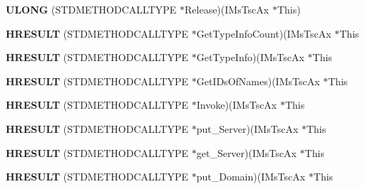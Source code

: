 \begin{DoxyCompactItemize}
\item 
\mbox{\label{struct_i_ms_tsc_ax_vtbl_a4a95618482c2a91fa01823290c9b4581}} 
{\bfseries U\+L\+O\+NG} (S\+T\+D\+M\+E\+T\+H\+O\+D\+C\+A\+L\+L\+T\+Y\+PE $\ast$Release)(I\+Ms\+Tsc\+Ax $\ast$This)
\item 
\mbox{\label{struct_i_ms_tsc_ax_vtbl_a1417abc3fd2b2ca2965a8dc2d57def0f}} 
{\bfseries H\+R\+E\+S\+U\+LT} (S\+T\+D\+M\+E\+T\+H\+O\+D\+C\+A\+L\+L\+T\+Y\+PE $\ast$Get\+Type\+Info\+Count)(I\+Ms\+Tsc\+Ax $\ast$This
\item 
\mbox{\label{struct_i_ms_tsc_ax_vtbl_adf7024877e100b4350830056a97eebff}} 
{\bfseries H\+R\+E\+S\+U\+LT} (S\+T\+D\+M\+E\+T\+H\+O\+D\+C\+A\+L\+L\+T\+Y\+PE $\ast$Get\+Type\+Info)(I\+Ms\+Tsc\+Ax $\ast$This
\item 
\mbox{\label{struct_i_ms_tsc_ax_vtbl_ac85b48ee4ab75cdfc9ec71664dc1c606}} 
{\bfseries H\+R\+E\+S\+U\+LT} (S\+T\+D\+M\+E\+T\+H\+O\+D\+C\+A\+L\+L\+T\+Y\+PE $\ast$Get\+I\+Ds\+Of\+Names)(I\+Ms\+Tsc\+Ax $\ast$This
\item 
\mbox{\label{struct_i_ms_tsc_ax_vtbl_a89df322574d46e760a9fd5ca36a7ad7b}} 
{\bfseries H\+R\+E\+S\+U\+LT} (S\+T\+D\+M\+E\+T\+H\+O\+D\+C\+A\+L\+L\+T\+Y\+PE $\ast$Invoke)(I\+Ms\+Tsc\+Ax $\ast$This
\item 
\mbox{\label{struct_i_ms_tsc_ax_vtbl_adbbb73f1bd99e75835b30c46f9476ab4}} 
{\bfseries H\+R\+E\+S\+U\+LT} (S\+T\+D\+M\+E\+T\+H\+O\+D\+C\+A\+L\+L\+T\+Y\+PE $\ast$put\+\_\+\+Server)(I\+Ms\+Tsc\+Ax $\ast$This
\item 
\mbox{\label{struct_i_ms_tsc_ax_vtbl_a4549cfbe9269e3e1fd663903a99823e0}} 
{\bfseries H\+R\+E\+S\+U\+LT} (S\+T\+D\+M\+E\+T\+H\+O\+D\+C\+A\+L\+L\+T\+Y\+PE $\ast$get\+\_\+\+Server)(I\+Ms\+Tsc\+Ax $\ast$This
\item 
\mbox{\label{struct_i_ms_tsc_ax_vtbl_a3be796247ccac922121ef0c8256ba80e}} 
{\bfseries H\+R\+E\+S\+U\+LT} (S\+T\+D\+M\+E\+T\+H\+O\+D\+C\+A\+L\+L\+T\+Y\+PE $\ast$put\+\_\+\+Domain)(I\+Ms\+Tsc\+Ax $\ast$This
\item 

\end{DoxyCompactItemize}

